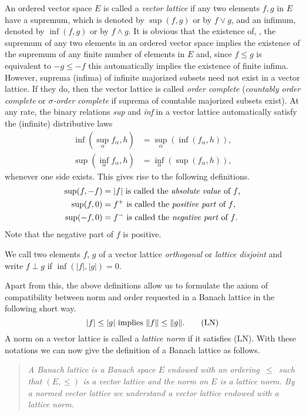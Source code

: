 An ordered vector space $ E $ is called a \emph{vector lattice} if any two elements $ f, g $ in $ E $ have a supremum, which is denoted by $ \sup(f,g) $ or by $ f \vee g $, and an infimum, denoted by $ \inf(f,g) $ or by $ f \wedge g $.
It is obvious that the existence of, \eg, the supremum of any two elements in an ordered vector space implies the existence of the supremum of any finite number of elements in $ E $ and, since $ f \leq g $ is equivalent to $ -g \leq -f $ this automatically implies the existence of finite infima.
However, suprema (infima) of infinite majorized subsets need not exist in a vector lattice.
If they do, then the vector lattice is called \emph{order complete} (\emph{countably order complete} or \emph{$ \sigma $-order complete} if suprema of countable majorized subsets exist).
At any rate, the binary relations \emph{sup} and \emph{inf} in a vector lattice automatically satisfy the (infinite) distributive laws
\begin{align*}
\inf(\sup_{\alpha}f_{\alpha},h) & = \sup_{\alpha}(\inf(f_{\alpha},h)), \\
\sup(\inf_{\alpha}f_{\alpha},h) & = \inf_{\alpha}(\sup(f_{\alpha},h)),
\end{align*}
whenever one side exists.
This gives rise to the following definitions.
\begin{align*}
	\sup(f,-f) &= |f| \text{ is called the \emph{absolute value} of $ f $,} \\
	\sup(f,0) &= f^{+} \text{ is called the \emph{positive part} of $ f $,} \\
	\sup(-f,0) &= f^{-} \text{ is called the \emph{negative part} of $ f $.}
\end{align*}
Note that the negative part of $ f $ is positive.

We call two elements $ f $, $ g $ of a vector lattice \emph{orthogonal} or \emph{lattice disjoint} and write $ f \perp g $ if $ \inf(|f|,|g|) = 0 $.

Apart from this, the above definitions allow us to formulate the axiom of compatibility between norm and order requested in a Banach lattice in the following short way.
\begin{equation}\label{eq:c1-1}
	|f| \leq |g| \text{ implies $ \|f\| \leq \|g\| $.}  \tag{LN}
\end{equation}
A norm on a vector lattice is called a \emph{lattice norm} if it satisfies (LN).
With these notations we can now give the definition of a Banach lattice as follows.
\begin{quote}
\emph{A \emph{Banach lattice} is a Banach space $ E $ endowed with an ordering $ \,\leq\, $ such that $ (E,\leq) $ is a vector lattice and the norm on $ E $ is a lattice norm.
By a \emph{normed vector lattice} we understand a vector lattice endowed with a lattice norm.}
\end{quote}

